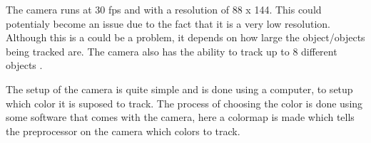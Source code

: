 The camera runs at 30 fps and with a resolution of 88 x 144. This could
potentialy become an issue due to the fact that it is a very low resolution.
Although this is a could be a problem, it depends on how large the
object/objects being tracked are.
The camera also has the ability to track up to 8 different objects
. \nl

The setup of the camera is quite simple and is done using a computer, to setup
which color it is suposed to track. The process of choosing the color is done
using some software that comes with the camera, here a colormap is made which
tells the preprocessor on the camera which colors to track. 
